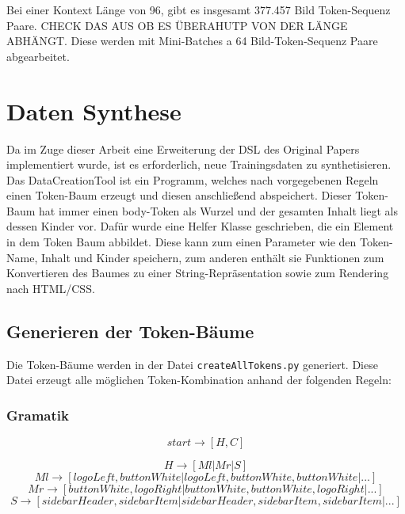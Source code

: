 \documentclass[pdftex,a4paper,halfparskip]{scrartcl}
\begin{document}
Bei einer Kontext Länge von 96, gibt es insgesamt 377.457 Bild Token-Sequenz Paare. CHECK DAS AUS OB ES ÜBERAHUTP VON DER LÄNGE ABHÄNGT. Diese werden mit Mini-Batches a 64 Bild-Token-Sequenz Paare abgearbeitet. 


\section{Daten Synthese}

Da im Zuge dieser Arbeit eine Erweiterung der DSL des Original Papers implementiert wurde, ist es erforderlich, neue Trainingsdaten zu synthetisieren. Das DataCreationTool ist ein Programm, welches nach vorgegebenen Regeln einen Token-Baum erzeugt und diesen anschließend abspeichert. Dieser Token-Baum hat immer einen body-Token als Wurzel und der gesamten Inhalt liegt als dessen Kinder vor. Dafür wurde eine Helfer Klasse geschrieben, die ein Element in dem Token Baum abbildet. Diese kann zum einen Parameter wie den Token-Name, Inhalt und Kinder speichern, zum anderen enthält sie Funktionen zum Konvertieren des Baumes zu einer String-Repräsentation sowie zum Rendering nach HTML/CSS. 

\subsection{Generieren der Token-Bäume}
Die Token-Bäume werden in der Datei \texttt{createAllTokens.py} generiert. Diese Datei erzeugt alle möglichen Token-Kombination anhand der folgenden Regeln:

\subsubsection{Gramatik}

\begin{equation}
start \rightarrow [H,C]
\end{equation}

\begin{equation}
H \rightarrow [Ml | Mr | S]
\end{equation}
\begin{equation}
Ml \rightarrow  [ logoLeft, buttonWhite | logoLeft, buttonWhite, buttonWhite | ...]
\end{equation}
\begin{equation}
Mr \rightarrow [buttonWhite, logoRight | buttonWhite, buttonWhite, logoRight | ...]
\end{equation}
\begin{equation}
S \rightarrow [sidebarHeader, sidebarItem| sidebarHeader, sidebarItem, sidebarItem | ...]
\end{equation}
\end{document}
